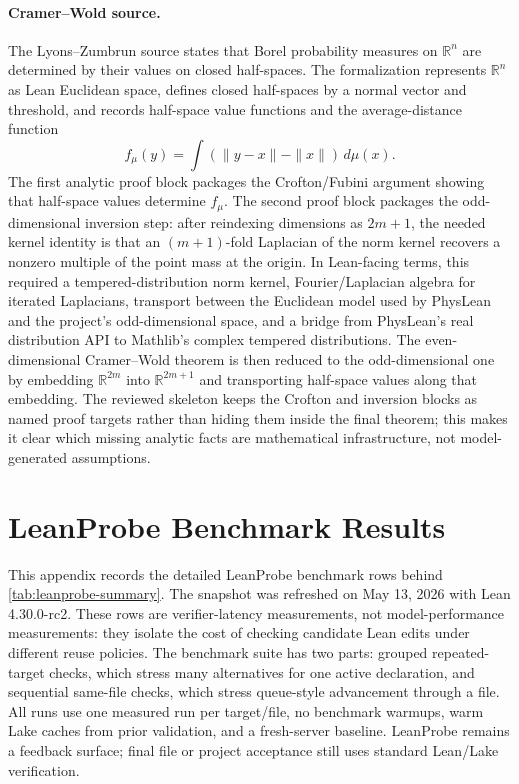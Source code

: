 \documentclass{article}
\newcommand{\lean}{Lean\xspace}
\begin{document}
\paragraph{Cramer--Wold source.}
The Lyons--Zumbrun source states that Borel probability measures on $\mathbb{R}^n$ are determined by their values on closed half-spaces.
The formalization represents $\mathbb{R}^n$ as \lean Euclidean space, defines closed half-spaces by a normal vector and threshold, and records half-space value functions and the average-distance function
\[
  f_\mu(y)=\int(\|y-x\|-\|x\|)\,d\mu(x).
\]
The first analytic proof block packages the Crofton/Fubini argument showing that half-space values determine $f_\mu$.
The second proof block packages the odd-dimensional inversion step: after reindexing dimensions as $2m+1$, the needed kernel identity is that an $(m+1)$-fold Laplacian of the norm kernel recovers a nonzero multiple of the point mass at the origin.
In \lean-facing terms, this required a tempered-distribution norm kernel, Fourier/Laplacian algebra for iterated Laplacians, transport between the Euclidean model used by PhysLean~\citep{physlean2025} and the project's odd-dimensional space, and a bridge from PhysLean's real distribution API to Mathlib's complex tempered distributions.
The even-dimensional Cramer--Wold theorem is then reduced to the odd-dimensional one by embedding $\mathbb{R}^{2m}$ into $\mathbb{R}^{2m+1}$ and transporting half-space values along that embedding.
The reviewed skeleton keeps the Crofton and inversion blocks as named proof targets rather than hiding them inside the final theorem; this makes it clear which missing analytic facts are mathematical infrastructure, not model-generated assumptions.

\section{LeanProbe Benchmark Results}
\label{app:leanprobe}

This appendix records the detailed LeanProbe benchmark rows behind \cref{tab:leanprobe-summary}.
The snapshot was refreshed on May 13, 2026 with Lean 4.30.0-rc2.
These rows are verifier-latency measurements, not model-performance measurements: they isolate the cost of checking candidate Lean edits under different reuse policies.
The benchmark suite has two parts: grouped repeated-target checks, which stress many alternatives for one active declaration, and sequential same-file checks, which stress queue-style advancement through a file.
All runs use one measured run per target/file, no benchmark warmups, warm Lake caches from prior validation, and a fresh-server baseline.
LeanProbe remains a feedback surface; final file or project acceptance still uses standard \lean/Lake verification.
\end{document}
